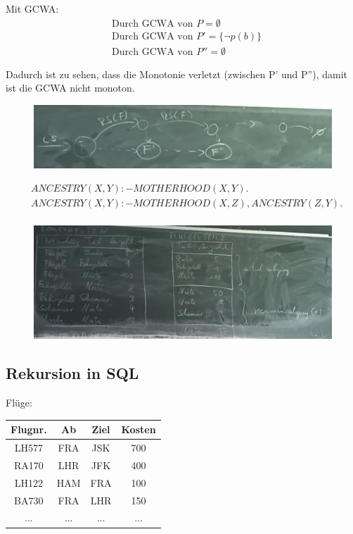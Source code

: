 \documentclass[12pt, a4paper]{article}
\begin{document}
Mit GCWA:
\begin{align*}
&\text{Durch GCWA von }P =  \emptyset \\
&\text{Durch GCWA von }P' = \{ \lnot p(b) \} \\
&\text{Durch GCWA von }P'' = \emptyset
\end{align*}

Dadurch ist zu sehen, dass die Monotonie verletzt (zwischen P' und P''), damit ist die GCWA nicht monoton.


\begin{figure}[h!]
\centering
\includegraphics[width=0.95\linewidth]{img/img16}
\caption{}
\label{fig:img16}
\end{figure}


\begin{align*}
& ANCESTRY(X,Y) :- MOTHERHOOD(X,Y). \\
& ANCESTRY(X,Y) :- MOTHERHOOD(X,Z), ANCESTRY(Z,Y). \\
\end{align*}


\begin{figure}[h!]
\centering
\includegraphics[width=0.95\linewidth]{img/img17}
\caption{}
\label{fig:img17}
\end{figure}

\subsection*{Rekursion in SQL}

Flüge: \\
\begin{tabular}{|c|c|c|c|}
\hline
Flugnr. & Ab & Ziel & Kosten \\ \hline
LH577 & FRA & JSK & 700 \\
RA170 & LHR & JFK & 400 \\
LH122 & HAM & FRA & 100 \\
BA730 & FRA & LHR & 150 \\ 
... & ... & ... & ... \\
\hline
\end{tabular}
\end{document}
